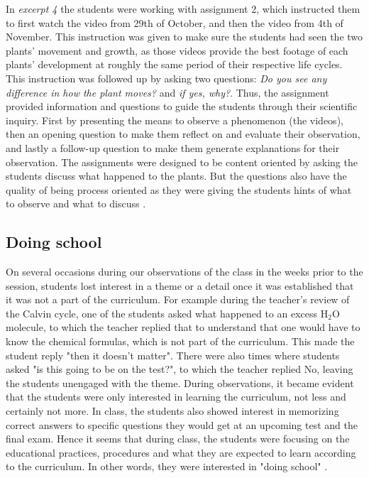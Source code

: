 In \emph{excerpt 4} the students were working with assignment 2, which instructed them to first watch the video from 29th of October, and then the video from 4th of November. This instruction was given to make sure the students had seen the two plants' movement and growth, as those videos provide the best footage of each plants' development at roughly the same period of their respective life cycles. This instruction was followed up by asking two questions: \emph{Do you see any difference in how the plant moves?} and \emph{if yes, why?}. Thus, the assignment provided information and questions to guide the students through their scientific inquiry. First by presenting the means to observe a phenomenon (the videos), then an opening question to make them reflect on and evaluate their observation, and lastly a follow-up question to make them generate explanations for their observation. The assignments were designed to be content oriented by asking the students discuss what happened to the plants. But the questions also have the quality of being process oriented as they were giving the students hints of what to observe and what to discuss \citep{furberg2009socio}. 


\subsection{Doing school}

On several occasions during our observations of the class in the weeks prior to the session, students lost interest in a theme or a detail once it was established that it was not a part of the curriculum. For example during the teacher's review of the Calvin cycle, one of the students asked what happened to an excess $\text{H}_2\text{O}$ molecule, to which the teacher replied that to understand that one would have to know the chemical formulas, which is not part of the curriculum. This made the student reply "then it doesn't matter". There were also times where students asked "is this going to be on the test?", to which the teacher replied No, leaving the students unengaged with the theme. During observations, it became evident that the students were only interested in learning the curriculum, not less and certainly not more. In class, the students also showed interest in memorizing correct answers to specific questions they would get at an upcoming test and the final exam. Hence it seems that during class, the students were focusing on the educational practices, procedures and what they are expected to learn according to the curriculum. In other words, they were interested in "doing school" \citep{jimenez2000doing}.


